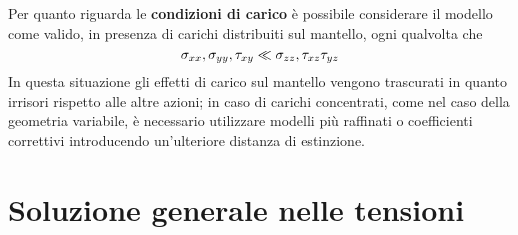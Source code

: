 		\vspace{3mm}
		Per quanto riguarda le \textbf{condizioni di carico} è possibile considerare il modello come valido, in presenza di carichi distribuiti sul mantello, ogni qualvolta che 
		\[ \sigma_{xx},\sigma_{yy},\tau_{xy} \ll \sigma_{zz},\tau_{xz}\tau_{yz}  \]
		In questa situazione gli effetti di carico sul mantello vengono trascurati in quanto irrisori rispetto alle altre azioni; in caso di carichi concentrati, come nel caso della geometria variabile, è necessario utilizzare modelli più raffinati o coefficienti correttivi introducendo un'ulteriore distanza di estinzione.
		
\section{Soluzione generale nelle tensioni}
	
		
		
	
	
	
	
	
	
	
	
	
	
	
	
	
	
	
	